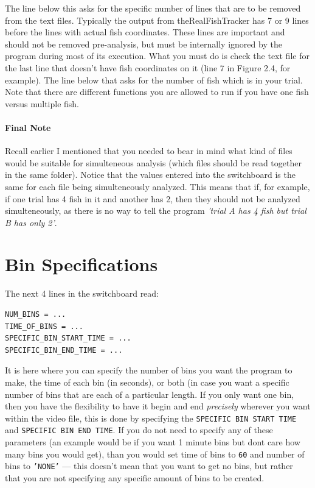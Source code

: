 \documentclass[12pt,titlepage]{report}
\begin{document}
The line below this asks for the specific number of lines that are to be removed from the text files. Typically the output from theRealFishTracker has 7 or 9 lines before the lines with actual fish coordinates. These lines are important and should not be removed pre-analysis, but must be internally ignored by the program during most of its execution. What you must do is check the text file for the last line that doesn't have fish coordinates on it (line 7 in Figure 2.4, for example).
The line below that asks for the number of fish which is in your trial. Note that there are different functions you are allowed to run if you have one fish versus multiple fish.
\paragraph{Final Note} Recall earlier I mentioned that you needed to bear in mind what kind of files would be suitable for simulteneous analysis (which files should be read together in the same folder). Notice that the values entered into the switchboard is the same for each file being simulteneously analyzed. This means that if, for example, if one trial has 4 fish in it and another has 2, then they should not be analyzed simulteneously, as there is no way to tell the program \emph{ 'trial A has 4 fish but trial B has only 2'}.

\section{Bin Specifications}
The next 4 lines in the switchboard read:
\begin{verbatim}
NUM_BINS = ...
TIME_OF_BINS = ...
SPECIFIC_BIN_START_TIME = ...                                  
SPECIFIC_BIN_END_TIME = ...                                 
\end{verbatim}
It is here where you can specify the number of bins you want the program to make, the time of each bin (in seconds), or both (in case you want a specific number of bins that are each of a particular length. If you only want one bin, then you have the flexibility to have it begin and end \emph{precisely} wherever you want within the video file, this is done by specifying the \texttt{SPECIFIC BIN START TIME} and \texttt{SPECIFIC BIN END TIME}. If you do not need to specify any of these parameters (an example would be if you want 1 minute bins but dont care how many bins you would get), than you would set time of bins to  \texttt{60} and number of bins to \texttt{'NONE'} --- this doesn't mean that you want to get no bins, but rather that you are not specifying any specific amount of bins to be created. 
\end{document}
